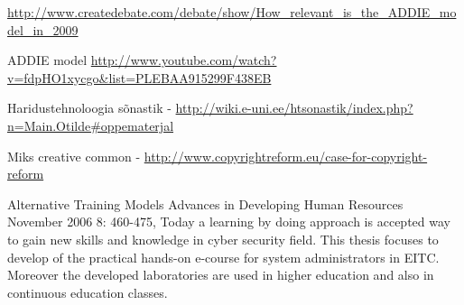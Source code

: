\url{http://www.createdebate.com/debate/show/How_relevant_is_the_ADDIE_model_in_2009}

ADDIE model \url{http://www.youtube.com/watch?v=fdpHO1xycgo&list=PLEBAA915299F438EB}


Haridustehnoloogia sõnastik - \url{http://wiki.e-uni.ee/htsonastik/index.php?n=Main.Otilde#oppematerjal}

Miks creative common - \url{http://www.copyrightreform.eu/case-for-copyright-reform}

Alternative Training Models
Advances in Developing Human Resources November 2006 8: 460-475,
Today a learning by doing approach is accepted way to gain new skills and knowledge in cyber security field. This thesis focuses to develop of the practical hands-on e-course for system administrators in \gls{EITC}. Moreover the developed laboratories are used in higher education and also in continuous education classes.

